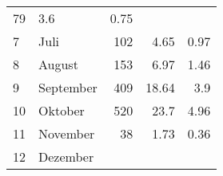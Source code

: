 \begin{longtable}{lXrrr}
       \num{79} &
       \num[round-mode=places,round-precision=2]{3,6} &
         \num[round-mode=places,round-precision=2]{0,75} \\

     7 &
     \multicolumn{1}{X}{ Juli   } &


       \num{102} &
       \num[round-mode=places,round-precision=2]{4,65} &
         \num[round-mode=places,round-precision=2]{0,97} \\

     8 &
     \multicolumn{1}{X}{ August   } &


       \num{153} &
       \num[round-mode=places,round-precision=2]{6,97} &
         \num[round-mode=places,round-precision=2]{1,46} \\

     9 &
     \multicolumn{1}{X}{ September   } &


       \num{409} &
       \num[round-mode=places,round-precision=2]{18,64} &
         \num[round-mode=places,round-precision=2]{3,9} \\

     10 &
     \multicolumn{1}{X}{ Oktober   } &


       \num{520} &
       \num[round-mode=places,round-precision=2]{23,7} &
         \num[round-mode=places,round-precision=2]{4,96} \\

     11 &
     \multicolumn{1}{X}{ November   } &


       \num{38} &
       \num[round-mode=places,round-precision=2]{1,73} &
         \num[round-mode=places,round-precision=2]{0,36} \\

     12 &
     \multicolumn{1}{X}{ Dezember   } &



\end{longtable}
